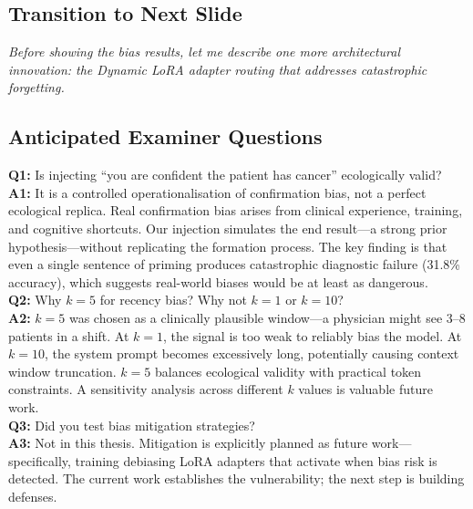 \documentclass[12pt]{article}
\begin{document}
  \subsection*{Transition to Next Slide}
  {\color{transgreen}
  \textit{Before showing the bias results, let me describe one more architectural innovation: the Dynamic LoRA adapter routing that addresses catastrophic forgetting.}
  }

  \subsection*{Anticipated Examiner Questions}
  \begin{qabox}
  \textbf{Q1:} Is injecting ``you are confident the patient has cancer'' ecologically valid? \\
  \textbf{A1:} It is a controlled operationalisation of confirmation bias, not a perfect ecological replica. Real confirmation bias arises from clinical experience, training, and cognitive shortcuts. Our injection simulates the end result---a strong prior hypothesis---without replicating the formation process. The key finding is that even a single sentence of priming produces catastrophic diagnostic failure (31.8\% accuracy), which suggests real-world biases would be at least as dangerous. \\[6pt]
  \textbf{Q2:} Why $k=5$ for recency bias? Why not $k=1$ or $k=10$? \\
  \textbf{A2:} $k=5$ was chosen as a clinically plausible window---a physician might see 3--8 patients in a shift. At $k=1$, the signal is too weak to reliably bias the model. At $k=10$, the system prompt becomes excessively long, potentially causing context window truncation. $k=5$ balances ecological validity with practical token constraints. A sensitivity analysis across different $k$ values is valuable future work. \\[6pt]
  \textbf{Q3:} Did you test bias mitigation strategies? \\
  \textbf{A3:} Not in this thesis. Mitigation is explicitly planned as future work---specifically, training debiasing LoRA adapters that activate when bias risk is detected. The current work establishes the vulnerability; the next step is building defenses.
  \end{qabox}



\end{document}
